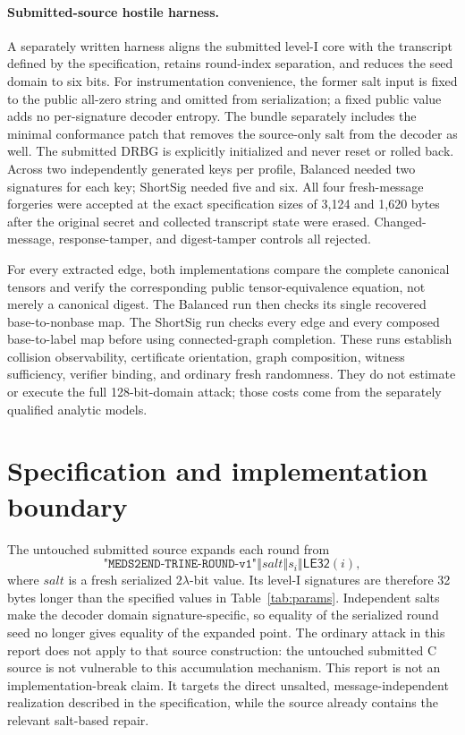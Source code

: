 \documentclass[11pt,a4paper]{article}
\begin{document}
\paragraph{Submitted-source hostile harness.}
A separately written harness aligns the submitted level-I core with the
transcript defined by the specification, retains round-index separation, and
reduces the seed domain to six
bits.  For instrumentation convenience, the former salt input is fixed to the
public all-zero string and omitted from serialization; a fixed public value
adds no per-signature decoder entropy.  The bundle separately includes the
minimal conformance patch that removes the source-only salt from the decoder
as well.  The submitted DRBG is explicitly initialized and never reset or
rolled back.  Across two independently generated keys per profile, Balanced
needed two signatures for each key; ShortSig needed five and six.  All four
fresh-message forgeries were accepted at the exact specification sizes of 3,124
and 1,620 bytes after the original secret and collected transcript state were erased.
Changed-message, response-tamper, and digest-tamper controls all rejected.

For every extracted edge, both implementations compare the complete canonical
tensors and verify the corresponding public tensor-equivalence equation, not
merely a canonical digest.  The Balanced run then checks its single recovered
base-to-nonbase map.  The ShortSig run checks every edge and every composed
base-to-label map before using connected-graph completion.  These runs
establish collision observability, certificate orientation, graph composition,
witness sufficiency, verifier binding, and ordinary fresh randomness.  They do
not estimate or execute the full 128-bit-domain attack; those costs come from
the separately qualified analytic models.

\section{Specification and implementation boundary}

The untouched submitted source expands each round from
\begin{equation}
 \texttt{"MEDS2END-TRINE-ROUND-v1"}\mathbin\Vert
 \mathit{salt}\mathbin\Vert s_i\mathbin\Vert
 \mathsf{LE32}(i),                                      \label{eq:sourcedomain}
\end{equation}
where $\mathit{salt}$ is a fresh serialized $2\lambda$-bit value.  Its level-I
signatures are therefore 32 bytes longer than the specified values in
Table~\ref{tab:params}.  Independent salts make the decoder domain
signature-specific, so equality of the serialized round seed no longer gives
equality of the expanded point.  The ordinary attack in this report does not
apply to that source construction: the untouched submitted C source is not
vulnerable to this accumulation mechanism.  This report is not an
implementation-break claim.  It targets the direct unsalted,
message-independent realization described in the specification, while the
source already contains the relevant salt-based repair.
\end{document}
